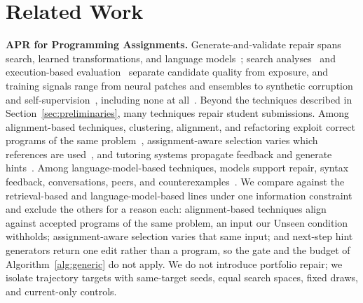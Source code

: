 \documentclass[10pt,conference]{IEEEtran}
\begin{document}
\section{Related Work}
\label{sec:related}
\noindent\textbf{APR for Programming Assignments.} Generate-and-validate repair spans search, learned transformations, and language models~\cite{gazzola2019automatic,monperrus2018automatic,weimer2009automatically,legoues2012genprog}; search analyses~\cite{qi2014strength} and execution-based evaluation~\cite{haque2023fixeval,chen2021evaluating} separate candidate quality from exposure, and training signals range from neural patches and ensembles to synthetic corruption and self-supervision~\cite{tufano2019empirical,lutellier2020coconut,yasunaga2021break,ye2022selfapr}, including none at all~\cite{xia2022less,jiang2023impact}. Beyond the techniques described in Section~\ref{sec:preliminaries}, many techniques repair student submissions. Among alignment-based techniques, clustering, alignment, and refactoring exploit correct programs of the same problem~\cite{gulwani2018automated,wang2018search,hu2019re}, assignment-aware selection varies which references are used~\cite{heo2023referent,choi2021automated,choi2025automated}, and tutoring systems propagate feedback and generate hints~\cite{piech2015embeddings,glassman2015overcode,rivers2017data,price2017isnap}. Among language-model-based techniques, models support repair, syntax feedback, conversations, peers, and counterexamples~\cite{joshi2023repair,zhang2024pydex,phung2023generating,liu2024fastfixer,yang2024cref,zhao2026peer,orvalho2025counterexample}. We compare against the retrieval-based and language-model-based lines under one information constraint and exclude the others for a reason each: alignment-based techniques align against accepted programs of the same problem, an input our Unseen condition withholds; assignment-aware selection varies that same input; and next-step hint generators return one edit rather than a program, so the gate and the budget of Algorithm~\ref{alg:generic} do not apply. We do not introduce portfolio repair; we isolate trajectory targets with same-target seeds, equal search spaces, fixed draws, and current-only controls.
\end{document}
